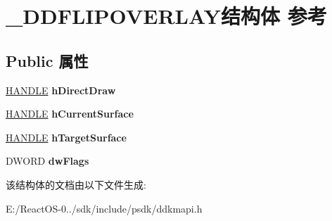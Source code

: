 \hypertarget{struct___d_d_f_l_i_p_o_v_e_r_l_a_y}{}\section{\+\_\+\+D\+D\+F\+L\+I\+P\+O\+V\+E\+R\+L\+A\+Y结构体 参考}
\label{struct___d_d_f_l_i_p_o_v_e_r_l_a_y}
\subsection*{Public 属性}
\begin{DoxyCompactItemize}
\item 
\mbox{\label{struct___d_d_f_l_i_p_o_v_e_r_l_a_y_aa2751801271a530e08110381b0757b2b}} 
\hyperlink{interfacevoid}{H\+A\+N\+D\+LE} {\bfseries h\+Direct\+Draw}
\item 
\mbox{\label{struct___d_d_f_l_i_p_o_v_e_r_l_a_y_a21e1f7cdefd5a130c62865a3c81c9bd0}} 
\hyperlink{interfacevoid}{H\+A\+N\+D\+LE} {\bfseries h\+Current\+Surface}
\item 
\mbox{\label{struct___d_d_f_l_i_p_o_v_e_r_l_a_y_aabb4419c4eeabff927344c029e14f2ea}} 
\hyperlink{interfacevoid}{H\+A\+N\+D\+LE} {\bfseries h\+Target\+Surface}
\item 
\mbox{\label{struct___d_d_f_l_i_p_o_v_e_r_l_a_y_a03f351446031fd0e3f2780f6ca69d605}} 
D\+W\+O\+RD {\bfseries dw\+Flags}
\end{DoxyCompactItemize}


该结构体的文档由以下文件生成\+:\begin{DoxyCompactItemize}
\item 
E\+:/\+React\+O\+S-\/0../sdk/include/psdk/ddkmapi.\+h\end{DoxyCompactItemize}
